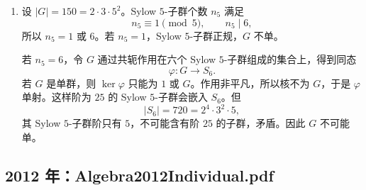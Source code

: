 \documentclass[UTF8,12pt]{ctexart}
\begin{document}
\begin{enumerate}[label=\textbf{\arabic*.},leftmargin=2.2em]
\item 设 \(|G|=150=2\cdot3\cdot5^2\)。Sylow \(5\)-子群个数 \(n_5\) 满足
\[
n_5\equiv1\pmod5,\qquad n_5\mid6,
\]
所以 \(n_5=1\) 或 \(6\)。若 \(n_5=1\)，Sylow \(5\)-子群正规，\(G\) 不单。

若 \(n_5=6\)，令 \(G\) 通过共轭作用在六个 Sylow \(5\)-子群组成的集合上，得到同态
\[
\varphi:G\to S_6.
\]
若 \(G\) 是单群，则 \(\ker\varphi\) 只能为 \(1\) 或 \(G\)。作用非平凡，所以核不为 \(G\)，于是 \(\varphi\) 单射。这样阶为 \(25\) 的 Sylow \(5\)-子群会嵌入 \(S_6\)。但
\[
|S_6|=720=2^4\cdot3^2\cdot5,
\]
其 Sylow \(5\)-子群阶只有 \(5\)，不可能含有阶 \(25\) 的子群，矛盾。因此 \(G\) 不可能单。
\end{enumerate}


\subsection{2012 年：Algebra2012Individual.pdf}
\end{document}
